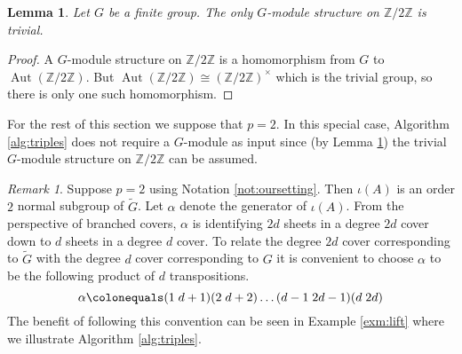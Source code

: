 \documentclass{dcthesis}
\newcommand{\ZZ}{\mathbb Z}
\newcommand{\mm}[1]{{\color{blue} \sf MM: [#1]}}
\newcommand{\wt}[1]{\widetilde{#1}}
\DeclareMathOperator{\Aut}{Aut}
\numberwithin{equation}{section}
\newtheorem{lemma}[equation]{Lemma}
\theoremstyle{definition}
\theoremstyle{remark}
\newtheorem{remark}[equation]{Remark}
\begin{document}
{{\begin{lemma}
      \label{lem:trivialGmoduleonly}
      Let $G$ be a finite group.
      The only $G$-module structure on
      $\ZZ/2\ZZ$ is trivial.
    \end{lemma}
    \begin{proof}
      A $G$-module structure on $\ZZ/2\ZZ$
      is a homomorphism
      from $G$ to $\Aut(\ZZ/2\ZZ)$.
      But $\Aut(\ZZ/2\ZZ)\cong(\ZZ/2\ZZ)^\times$
      which is the trivial group,
      so there is only one such
      homomorphism.
    \end{proof}
    For the rest of this section we suppose
    that $p=2$.
    In this special case,
    Algorithm
    \ref{alg:triples}
    does not require
    a $G$-module as input
    since
    (by Lemma
    \ref{lem:trivialGmoduleonly})
    the trivial $G$-module structure
    on $\ZZ/2\ZZ$ can be assumed.
    \begin{remark}
      \label{rmk:distinguishedinvolution}
      Suppose $p=2$ using Notation
      \ref{not:oursetting}.
      Then $\iota(A)$ is an
      order $2$ normal subgroup of $\wt{G}$.
      Let $\alpha$ denote the generator of
      $\iota(A)$.
      From the perspective of branched covers,
      $\alpha$ is identifying $2d$ sheets
      in a degree $2d$ cover down to $d$ sheets
      in a degree $d$ cover.
      To relate the degree $2d$ cover
      corresponding to $\wt{G}$
      with the
      degree $d$ cover
      corresponding to $G$
      it is convenient to choose $\alpha$
      to be the following product of $d$
      transpositions.
      \begin{equation}
        \label{eqn:alpha}
        \alpha\colonequals
        (1\;d+1)(2\;d+2)\dots
        (d-1\;2d-1)(d\;2d)
      \end{equation}
      The benefit of following this convention
      can be seen in Example
      \ref{exm:lift}
      where we
      illustrate Algorithm \ref{alg:triples}.
    \end{remark}
}}
\end{document}

